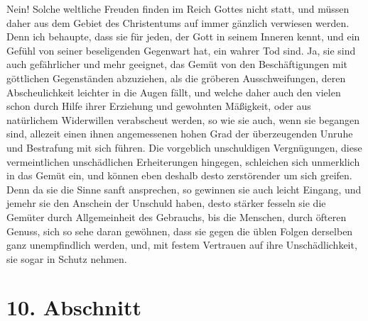 Nein! Solche weltliche Freuden finden im Reich Gottes
nicht statt, und müssen daher aus dem Gebiet des Christentums auf immer
gänzlich verwiesen werden. Denn ich behaupte, dass sie für jeden, der Gott in
seinem Inneren kennt, und ein Gefühl von seiner beseligenden Gegenwart hat, ein
wahrer Tod sind. Ja, sie sind auch gefährlicher und mehr geeignet, das Gemüt
von den Beschäftigungen mit göttlichen Gegenständen abzuziehen, als die gröberen
Ausschweifungen, deren Abscheulichkeit leichter in die Augen fällt, und welche
daher auch den vielen schon durch Hilfe ihrer Erziehung und gewohnten Mäßigkeit,
oder aus natürlichem Widerwillen verabscheut werden, so wie sie auch, wenn sie
begangen sind, allezeit einen ihnen angemessenen hohen Grad der überzeugenden
Unruhe und Bestrafung mit sich führen. Die vorgeblich unschuldigen Vergnügungen,
diese vermeintlichen unschädlichen Erheiterungen hingegen, schleichen sich
unmerklich in das Gemüt ein, und können eben deshalb desto zerstörender um sich
greifen. Denn da sie die Sinne sanft ansprechen, so gewinnen sie auch leicht
Eingang, und jemehr sie den Anschein der Unschuld haben, desto stärker fesseln
sie die Gemüter durch Allgemeinheit des Gebrauchs, bis die Menschen, durch
öfteren Genuss, sich so sehe daran gewöhnen, dass sie gegen die üblen Folgen
derselben ganz unempfindlich werden, und, mit festem Vertrauen auf ihre
Unschädlichkeit, sie sogar in Schutz nehmen.

\section{10. Abschnitt} \label{kap15_ab10}


